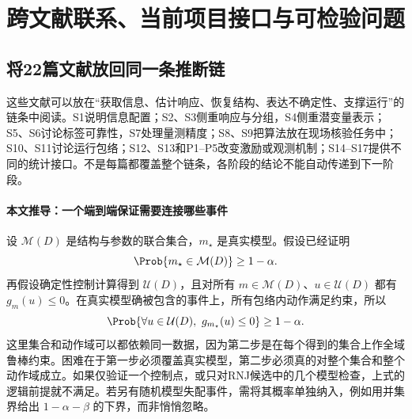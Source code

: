 \section{跨文献联系、当前项目接口与可检验问题}
\subsection{将22篇文献放回同一条推断链}
这些文献可以放在“获取信息、估计响应、恢复结构、表达不确定性、支撑运行”的链条中阅读。S1说明信息配置；S2、S3侧重响应与分组，S4侧重潜变量表示；S5、S6讨论标签可靠性，S7处理量测精度；S8、S9把算法放在现场核验任务中；S10、S11讨论运行包络；S12、S13和P1--P5改变激励或观测机制；S14--S17提供不同的统计接口。不是每篇都覆盖整个链条，各阶段的结论不能自动传递到下一阶段。

\begin{center}
\end{center}

\paragraph{本文推导：一个端到端保证需要连接哪些事件}
设 $\mathcal M(D)$ 是结构与参数的联合集合，$m_\star$ 是真实模型。假设已经证明
\begin{equation}
 \Prob\{m_\star\in\mathcal M(D)\}\geq1-\alpha.
\end{equation}
再假设确定性控制计算得到 $\mathcal U(D)$，且对所有 $m\in\mathcal M(D)$、$u\in\mathcal U(D)$ 都有 $g_m(u)\leq0$。在真实模型确被包含的事件上，所有包络内动作满足约束，所以
\begin{equation}
 \Prob\{\forall u\in\mathcal U(D),\ g_{m_\star}(u)\leq0\}\geq1-\alpha.
 \label{eq:end-to-end}
\end{equation}
这里集合和动作域可以都依赖同一数据，因为第二步是在每个得到的集合上作全域鲁棒约束。困难在于第一步必须覆盖真实模型，第二步必须真的对整个集合和整个动作域成立。如果仅验证一个控制点，或只对RNJ候选中的几个模型检查，上式的逻辑前提就不满足。若另有随机模型失配事件，需将其概率单独纳入，例如用并集界给出 $1-\alpha-\beta$ 的下界，而非悄悄忽略。

